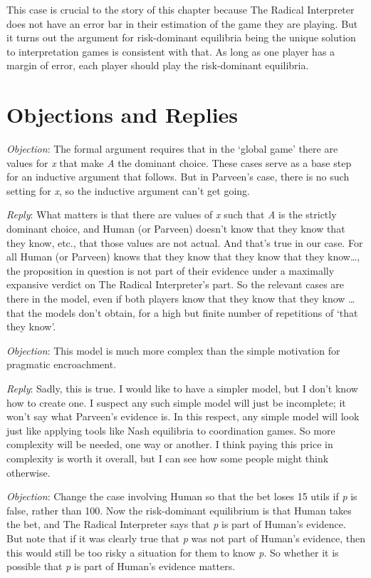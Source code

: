 \documentclass[
  12pt,
  letterpaper,
]{scrbook}
\begin{document}
This case is crucial to the story of this chapter because The Radical
Interpreter does not have an error bar in their estimation of the game
they are playing. But it turns out the argument for risk-dominant
equilibria being the unique solution to interpretation games is
consistent with that. As long as one player has a margin of error, each
player should play the risk-dominant equilibria.

\section{Objections and Replies}\label{sec-evsolution}

\emph{Objection}: The formal argument requires that in the `global game'
there are values for \emph{x} that make \emph{A} the dominant choice.
These cases serve as a base step for an inductive argument that follows.
But in Parveen's case, there is no such setting for \emph{x}, so the
inductive argument can't get going.

\emph{Reply}: What matters is that there are values of \emph{x} such
that \emph{A} is the strictly dominant choice, and Human (or Parveen)
doesn't know that they know that they know, etc., that those values are
not actual. And that's true in our case. For all Human (or Parveen)
knows that they know that they know that they know\ldots, the
proposition in question is not part of their evidence under a maximally
expansive verdict on The Radical Interpreter's part. So the relevant
cases are there in the model, even if both players know that they know
that they know \ldots{} that the models don't obtain, for a high but
finite number of repetitions of `that they know'.

\emph{Objection}: This model is much more complex than the simple
motivation for pragmatic encroachment.

\emph{Reply}: Sadly, this is true. I would like to have a simpler model,
but I don't know how to create one. I suspect any such simple model will
just be incomplete; it won't say what Parveen's evidence is. In this
respect, any simple model will look just like applying tools like Nash
equilibria to coordination games. So more complexity will be needed, one
way or another. I think paying this price in complexity is worth it
overall, but I can see how some people might think otherwise.

\emph{Objection}: Change the case involving Human so that the bet loses
15 utils if \emph{p} is false, rather than 100. Now the risk-dominant
equilibrium is that Human takes the bet, and The Radical Interpreter
says that \emph{p} is part of Human's evidence. But note that if it was
clearly true that \emph{p} was not part of Human's evidence, then this
would still be too risky a situation for them to know \emph{p}. So
whether it is possible that \emph{p} is part of Human's evidence
matters.
\end{document}

